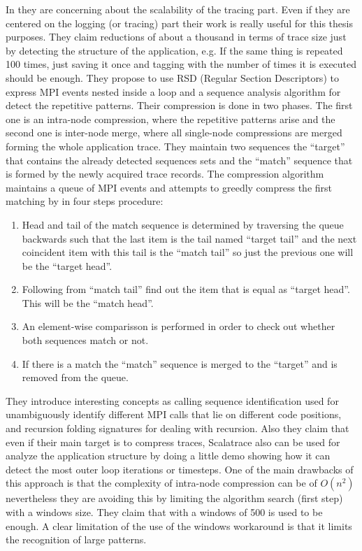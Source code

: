 In \cite{noeth2009scalatrace} they are concerning about the scalability of the
tracing part. Even if they are centered on the logging (or tracing) part their
work is really useful for this thesis purposes. They claim reductions of about a
thousand in terms of trace size just by detecting the structure of the
application, e.g. If the same thing is repeated 100 times, just saving it once
and tagging with the number of times it is executed should be enough. They
propose to use RSD (Regular Section Descriptors) to express MPI events nested
inside a loop and a sequence analysis algorithm for detect the repetitive 
patterns. Their compression
is done in two phases. The first one is an intra-node compression, where the
repetitive patterns arise and the second one is inter-node merge, where all
single-node compressions are merged forming the whole application trace.
They maintain two sequences the ``target'' that contains the already detected
sequences sets and the ``match'' sequence that is formed by the newly acquired
trace records. The compression algorithm maintains a queue of MPI events and 
attempts to greedly compress the first matching by  in four steps procedure:
\begin{enumerate}[label=\roman*)]
  \item Head and tail of the match sequence is determined by traversing the
    queue backwards such that the last item is the tail named ``target tail''
    and the next coincident item with this tail is the ``match tail'' so just
    the previous one will be the ``target head''.
  \item Following from ``match tail'' find out the item that is equal as
    ``target head''. This will be the ``match head''.
  \item An element-wise comparisson is performed in order to check out whether 
    both sequences match or not.
  \item If there is a match the ``match'' sequence is merged to the ``target''
    and is removed from the queue.
\end{enumerate}
They introduce interesting concepts as calling sequence identification used for
unambiguously identify different MPI calls that lie on different code positions, 
and recursion folding signatures for dealing with recursion. Also they claim
that even if their main target is to compress traces, Scalatrace also can be
used for analyze the application structure by doing a little demo showing how it
can detect the most outer loop iterations or timesteps. One of the main
drawbacks of this approach is that the complexity of intra-node compression 
can be of $O(n^2)$ nevertheless they are avoiding this by
limiting the algorithm search (first step) with a windows size. They claim that
with a windows of 500 is used to be enough. A clear limitation of the use of the
windows workaround is that it limits the recognition of large patterns.

